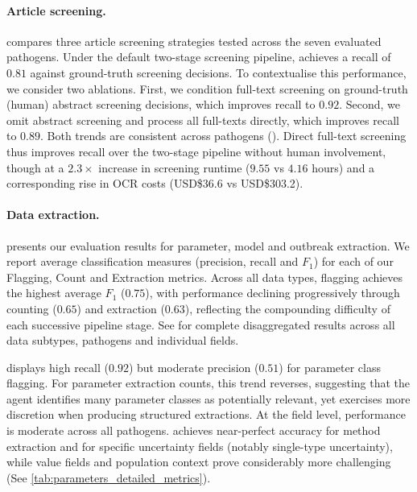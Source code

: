 \paragraph{Article screening.}
 compares three article screening strategies tested across the seven evaluated pathogens. Under the default two-stage screening pipeline, \name{} achieves a recall of $0.81$ against ground-truth screening decisions. To contextualise this performance, we consider two ablations. First, we condition full-text screening on ground-truth (human) abstract screening decisions, which improves recall to $0.92$. Second, we omit abstract screening and process all full-texts directly, which improves recall to $0.89$. Both trends are consistent across pathogens (). Direct full-text screening thus improves recall over the two-stage pipeline without human involvement, though at a $2.3\times$ increase in screening runtime ($9.55$ vs $4.16$ hours) and a corresponding rise in OCR costs (USD\$36.6 vs USD\$303.2).

\paragraph{Data extraction.}
 presents our evaluation results for parameter, model and outbreak extraction. We report average classification measures (precision, recall and $F_1$) for each of our Flagging, Count and Extraction metrics. Across all data types, flagging achieves the highest average $F_1$ ($0.75$), with performance declining progressively through counting ($0.65$) and extraction ($0.63$), reflecting the compounding difficulty of each successive pipeline stage.
See  for complete disaggregated results across all data subtypes, pathogens and individual fields.

\name{} displays high recall ($0.92$) but moderate precision ($0.51$) for parameter class flagging. For parameter extraction counts, this trend reverses, suggesting that the agent identifies many parameter classes as potentially relevant, yet exercises more discretion when producing structured extractions. At the field level, performance is moderate across all pathogens. \name{} achieves near-perfect accuracy for method extraction and for specific uncertainty fields (notably single-type uncertainty), while value fields and population context prove considerably more challenging (See \cref{tab:parameters_detailed_metrics}). 

